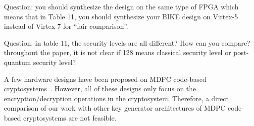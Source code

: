 \documentclass[runningheads]{llncs}
\begin{document}
{\color{red} Question: you should synthesize the design on the
same type of FPGA which means that in Table 11, 
you should synthesize your BIKE design on Virtex-5 instead
of Virtex-7 for ``fair comparison''.}

{\color{red} Question: in table 11, the security levels are all different?
How can you compare? throughout the paper, it is not clear
if 128 means classical security level or
post-quantum security level?}



A few hardware designs have been proposed on MDPC code-based 
cryptosystems~\cite{heyse2013smaller,von2014lightweight,hu2017area}.
However, all of these designs only focus on the encryption/decryption
operations in the cryptosystem.
Therefore, a direct comparison of our work
with other key generator architectures of MDPC code-based 
cryptosystems are not feasible.
\end{document}
